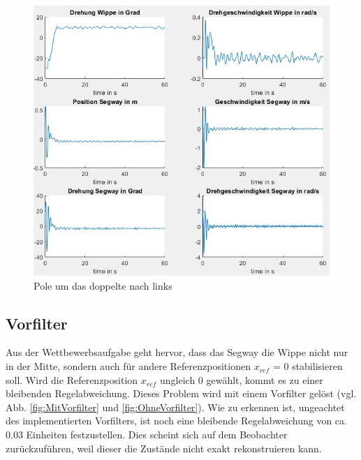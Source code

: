 \documentclass[pdf]{ifacconf}
\begin{document}
\begin{figure}[H]	
\centerline{\includegraphics[width=\linewidth]{Bilder/Regler1mal2.jpg}}
	\caption{Pole um das doppelte nach links}	\label{fig:Rauschen2}
\end{figure}




	\subsection{Vorfilter}
	Aus der Wettbewerbsaufgabe geht hervor, dass das Segway die Wippe nicht nur in der Mitte, sondern auch für andere Referenzpositionen $x^{}_{ref}$ = 0 stabilisieren soll. Wird die Referenzposition $x^{}_{ref}$ ungleich 0 gewählt, kommt es zu einer bleibenden Regelabweichung. Dieses Problem wird mit einem Vorfilter gelöst (vgl. Abb. \ref{fig:MitVorfilter} und \ref{fig:OhneVorfilter}). Wie zu erkennen ist, 
	ungeachtet des implementierten Vorfilters, ist noch eine bleibende Regelabweichung von ca. 0.03 Einheiten festzustellen. Dies scheint sich auf dem Beobachter zurückzuführen, weil dieser die Zustände nicht exakt rekonstruieren kann.  
\end{document}
